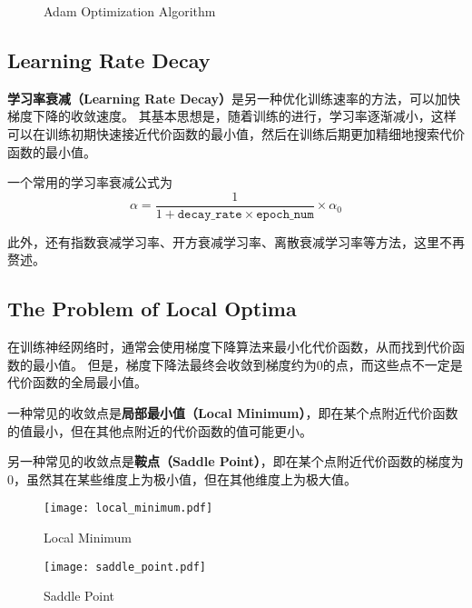 \begin{figure}[h!bt]
    \centering
    \centering
    \caption{Adam Optimization Algorithm}
    \label{fig:adam}
\end{figure}

\subsection{Learning Rate Decay}

\textbf{学习率衰减（Learning Rate Decay）}是另一种优化训练速率的方法，可以加快梯度下降的收敛速度。
其基本思想是，随着训练的进行，学习率逐渐减小，这样可以在训练初期快速接近代价函数的最小值，然后在训练后期更加精细地搜索代价函数的最小值。

一个常用的学习率衰减公式为
\begin{equation}
    \alpha = \frac{1}{1 + \mathtt{decay\_rate} \times \mathtt{epoch\_num}} \times \alpha_0
\end{equation}

此外，还有指数衰减学习率、开方衰减学习率、离散衰减学习率等方法，这里不再赘述。

\subsection{The Problem of Local Optima}

在训练神经网络时，通常会使用梯度下降算法来最小化代价函数，从而找到代价函数的最小值。
但是，梯度下降法最终会收敛到梯度约为0的点，而这些点不一定是代价函数的全局最小值。

一种常见的收敛点是\textbf{局部最小值（Local Minimum）}，即在某个点附近代价函数的值最小，但在其他点附近的代价函数的值可能更小。

另一种常见的收敛点是\textbf{鞍点（Saddle Point）}，即在某个点附近代价函数的梯度为0，虽然其在某些维度上为极小值，但在其他维度上为极大值。
\begin{figure}[h!bt]
    \centering
    \begin{minipage}[t]{0.48\textwidth}
        \centering
        \texttt{[image: local\_minimum.pdf]}
        \caption{Local Minimum}
        \label{fig:local_minimum}
    \end{minipage}
    \begin{minipage}[t]{0.48\textwidth}
        \centering
        \texttt{[image: saddle\_point.pdf]}
        \caption{Saddle Point}
        \label{fig:saddle_point}
    \end{minipage}
\end{figure}

